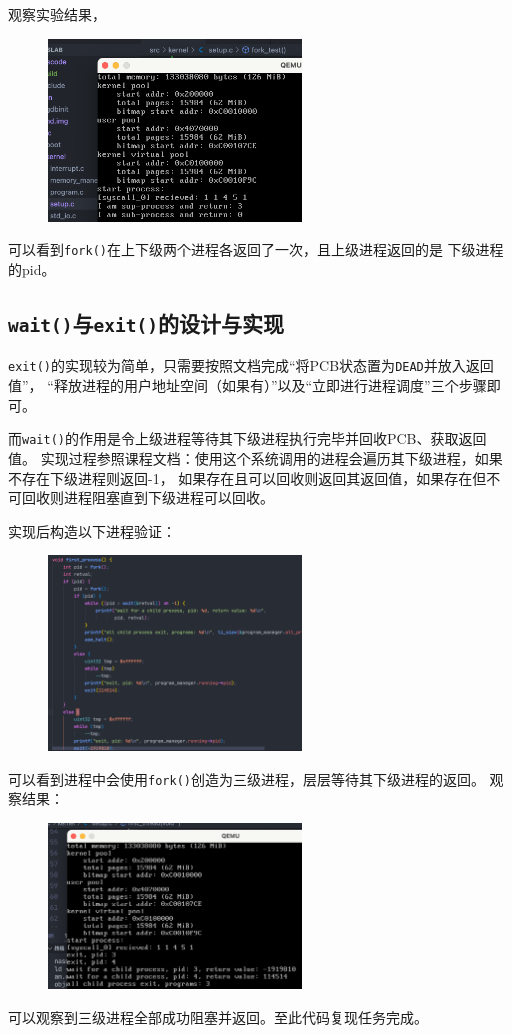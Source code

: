观察实验结果，

\begin{figure}[H]
    \centering
    \includegraphics[width=0.6\textwidth]{figures/forkRes.png}
    \label{forkRes}
\end{figure}

可以看到\texttt{fork()}在上下级两个进程各返回了一次，且上级进程返回的是
下级进程的pid。

\subsection{\texttt{wait()}与\texttt{exit()}的设计与实现}

\texttt{exit()}的实现较为简单，只需要按照文档完成“将PCB状态置为\texttt{DEAD}并放入返回值”，
“释放进程的用户地址空间（如果有）”以及“立即进行进程调度”三个步骤即可。

而\texttt{wait()}的作用是令上级进程等待其下级进程执行完毕并回收PCB、获取返回值。
实现过程参照课程文档：使用这个系统调用的进程会遍历其下级进程，如果不存在下级进程则返回-1，
如果存在且可以回收则返回其返回值，如果存在但不可回收则进程阻塞直到下级进程可以回收。

实现后构造以下进程验证：

\begin{figure}[H]
    \centering
    \includegraphics[width=0.6\textwidth]{figures/firstText.png}
    \label{firstText}
\end{figure}

可以看到进程中会使用\texttt{fork()}创造为三级进程，层层等待其下级进程的返回。
观察结果：

\begin{figure}[H]
    \centering
    \includegraphics[width=0.6\textwidth]{figures/firstRes.png}
    \label{firstRes}
\end{figure}

可以观察到三级进程全部成功阻塞并返回。至此代码复现任务完成。